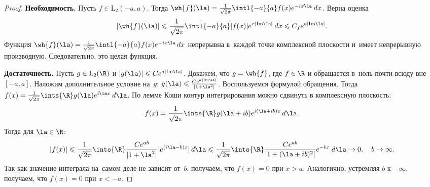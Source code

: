 \documentclass[a4paper]{article}
\newcommand{\dx}{\,dx}
\begin{document}
\begin{proof}
\textbf{Необходимость.}
Пусть $f\in\mbox{L}_2 (-a,a)$. Тогда $\wh{f}(\la)=\frac{1}{\sqrt{2\pi}}\intl{-a}{a} f(x) e^{-ix\la}\: dx$. Верна оценка
$$|\wh{f}(\la)|\leqslant \frac{1}{\sqrt{2\pi}}\intl{-a}{a} |f(x)| e^{x|\mathrm{Im}\la|}\: dx \leqslant C_f e^{a|\mathrm{Im}\la|}.$$
Функция $\wh{f}(\la)=\frac{1}{\sqrt{2\pi}}\intl{-a}{a} f(x) e^{-ix\la}\dx$ непрерывна в~каждой точке комплексной плоскости
и~имеет непрерывную производную. Следовательно, это целая функция.

\textbf{Достаточность.}
Пусть $g\in\mbox{L}_2(\R )$ и $|g(\la)|\leqslant C e^{a|\mathrm{Im}\la|}$. Докажем, что $g = \wh{f}$, где $f\in\R $ и обращается
в~ноль почти всюду вне $[-a,a]$. Наложим дополнительное условие на~$g$: $g(\la)\leqslant\frac{Ce^{a|\mathrm{Im}\la|}}{|1+\la^2|}$.
Воспользуемся формулой обращения. Тогда $f(x) = \frac{1}{\sqrt{2\pi}}\ints{\R }g(\la)e^{i\la x}\: d\la$.
По лемме Коши контур интегрирования можно сдвинуть в комплексную плоскость:
$$f(x)=\frac{1}{\sqrt{2\pi}}\ints{\R} g(\la + ib)e^{i(\la +ib) x}\, d\la.$$
Тогда для $\la\in\R $:
$$
|f(x)|\leqslant\frac{1}{\sqrt{2\pi}}\ints{\R}\frac{Ce^{ab}}{|1+\la^2|}|e^{(i\la - b)x}|\,d\la \leqslant
\frac{1}{\sqrt{2\pi}}\ints{\R}\frac{Ce^{ab}}{|1+(\la +ib)^2|}e^{-bx}\: d\la \rightarrow 0, \quad  b\rightarrow\infty.
$$
Так как значение интеграла на~самом деле не зависит от~$b$, получаем, что $f(x)=0$ при $x>a$. Аналогично, устремляя $b$ к $-\infty$,
получаем, что $f(x)=0$ при $x<-a$.


\end{proof}
\end{document}
